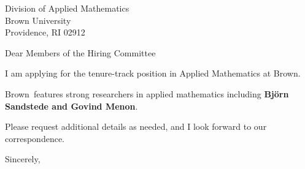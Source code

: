 




	
	
	\def\School{Brown}
	
	\begin{letter}
		{Division of Applied Mathematics\\
		Brown University\\
		Providence, RI 02912
		}
		
		\opening{Dear Members of the Hiring Committee}
		
		
		I am applying for the tenure-track position in Applied Mathematics at \School. 
		
		\School~features strong researchers in applied mathematics including \textbf{Björn Sandstede and Govind Menon}. 
		
		
		
		
		
		Please request additional details as needed, and I look forward to our correspondence.
		
		\closing{Sincerely,}
	\end{letter}
